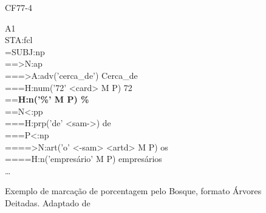 \begin{figure}[!h]
    CF77-4 \\
    \centering
    \begin{minipage}{10cm}
        A1\\
        STA:fcl\\
        =SUBJ:np\\
        ==>N:ap\\
        ===>A:adv('cerca\_de')  Cerca\_de\\
        ===H:num('72' <card> M P)  72\\
        ==\textbf{H:n('\%' M P)  \%}\\
        ==N<:pp\\
        ===H:prp('de' <sam->)  de\\
        ===P<:np\\
        ====>N:art('o' <-sam> <artd> M P)  os\\
        ====H:n('empresário' M P)  empresários\\    
        \ldots
    \end{minipage}
    \caption[Exemplo de marcação de porcentagem pelo Bosque]{Exemplo de marcação de porcentagem pelo Bosque, formato Árvores Deitadas. Adaptado de \cite[p~115]{afonso2006arvores}}
    \label{fig:bosque_percent}
\end{figure}